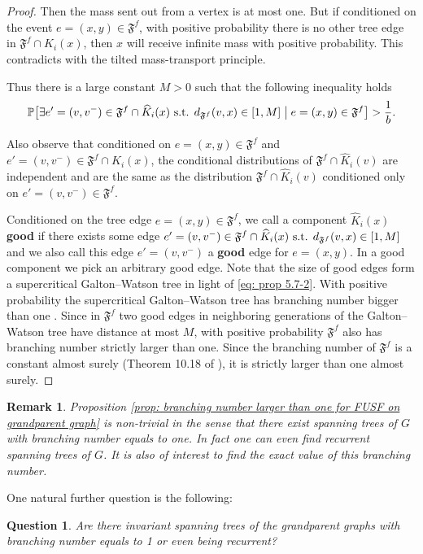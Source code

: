 \documentclass[12pt]{article}
\newtheorem{question}[theorem]{Question}
\newtheorem{remark}[theorem]{Remark}
\numberwithin{equation}{section}
\newcommand{\be}{\begin{equation}}
\newcommand{\ee}{\end{equation}}
\newcommand{\1}{\mathbf{1}}
\begin{document}
\begin{proof}
		Then the mass sent out from a vertex is at most one. But if conditioned on the event $e=(x,y)\in \mathfrak{F}^f$, with positive probability there is no other tree edge in $\mathfrak{F}^f\cap \widehat{K}_i(x)$, then $x$ will receive infinite mass with positive probability. This contradicts with the tilted mass-transport principle. 
	
Thus there is a large constant $M>0$ such that the following inequality holds
	\be\label{eq: prop 5.7-2}
	\mathbb{P}\big[ \exists e'=(v,v^-)\in\mathfrak{F}^f\cap \widehat{K}_i(x) \textnormal{ s.t. }d_{\mathfrak{F}^f}(v,x)\in [1,M]  \bigm| e=(x,y)\in \mathfrak{F}^f\big]>\frac{1}{b}.
	\ee	


	





Also observe that conditioned on $e=(x,y)\in \mathfrak{F}^f$ and $e'=(v,v^-)\in\mathfrak{F}^f\cap \widehat{K}_i(x)$, the conditional distributions of $\mathfrak{F}^f\cap \widehat{K}_i(v)$ are independent and are the same as the distribution $\mathfrak{F}^f\cap \widehat{K}_i(v)$ conditioned only on $e'=(v,v^-)\in\mathfrak{F}^f$.  %

Conditioned on the tree edge $e=(x,y)\in\mathfrak{F}^f$, we call a component $\widehat{K}_i(x)$ \textbf{good} if there exists some edge $e'=(v,v^-)\in\mathfrak{F}^f\cap \widehat{K}_i(x) \textnormal{ s.t. }d_{\mathfrak{F}^f}(v,x)\in [1,M] $ and we also call this edge $e'=(v,v^-)$ a \textbf{good} edge for $e=(x,y)$. In a good component we pick an arbitrary good edge. Note that the size of good edges form  a supercritical Galton--Watson tree in light of \eqref{eq: prop 5.7-2}.
With positive probability the supercritical Galton--Watson tree has branching number bigger than one \cite[Cor. 5.10]{LP2016}. Since in $\mathfrak{F}^f$ two good edges in neighboring generations of the Galton--Watson tree have distance at most $M$,
   with positive probability $\mathfrak{F}^f$ also has branching number strictly larger than one. Since the branching number of  $\mathfrak{F}^f$ is a constant almost surely (Theorem 10.18 of \cite{LP2016}), it is strictly larger than one almost surely. 
	\end{proof}


\begin{remark}
Proposition \ref{prop: branching number larger than one for FUSF on grandparent graph} is non-trivial in the sense that there exist spanning trees of $G$ with branching number equals to one. In fact one can even find recurrent spanning trees of $G$. It is also of interest to find the exact value of this branching number. 
\end{remark}
One natural further question is the following:
\begin{question}\label{ques: invariant recurrent spanning tree for grandparent graphs}
	Are there invariant spanning trees of the grandparent graphs with branching number equals to 1 or even being recurrent? 
\end{question}
\end{document}
